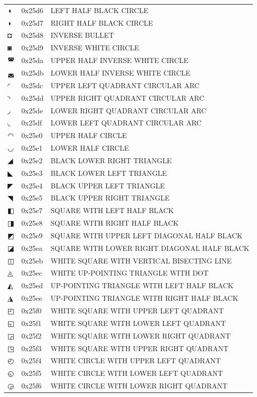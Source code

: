 \documentclass[12pt, twoside]{article}
\begin{document}
\begin{longtable}{L{1.0cm} L{2.0cm} >{\footnotesize}L{10cm}}
$◖$&0x25d6&LEFT HALF BLACK CIRCLE\\
$◗$&0x25d7&RIGHT HALF BLACK CIRCLE\\
$◘$&0x25d8&INVERSE BULLET\\
$◙$&0x25d9&INVERSE WHITE CIRCLE\\
$◚$&0x25da&UPPER HALF INVERSE WHITE CIRCLE\\
$◛$&0x25db&LOWER HALF INVERSE WHITE CIRCLE\\
$◜$&0x25dc&UPPER LEFT QUADRANT CIRCULAR ARC\\
$◝$&0x25dd&UPPER RIGHT QUADRANT CIRCULAR ARC\\
$◞$&0x25de&LOWER RIGHT QUADRANT CIRCULAR ARC\\
$◟$&0x25df&LOWER LEFT QUADRANT CIRCULAR ARC\\
$◠$&0x25e0&UPPER HALF CIRCLE\\
$◡$&0x25e1&LOWER HALF CIRCLE\\
$◢$&0x25e2&BLACK LOWER RIGHT TRIANGLE\\
$◣$&0x25e3&BLACK LOWER LEFT TRIANGLE\\
$◤$&0x25e4&BLACK UPPER LEFT TRIANGLE\\
$◥$&0x25e5&BLACK UPPER RIGHT TRIANGLE\\
$◧$&0x25e7&SQUARE WITH LEFT HALF BLACK\\
$◨$&0x25e8&SQUARE WITH RIGHT HALF BLACK\\
$◩$&0x25e9&SQUARE WITH UPPER LEFT DIAGONAL HALF BLACK\\
$◪$&0x25ea&SQUARE WITH LOWER RIGHT DIAGONAL HALF BLACK\\
$◫$&0x25eb&WHITE SQUARE WITH VERTICAL BISECTING LINE\\
$◬$&0x25ec&WHITE UP-POINTING TRIANGLE WITH DOT\\
$◭$&0x25ed&UP-POINTING TRIANGLE WITH LEFT HALF BLACK\\
$◮$&0x25ee&UP-POINTING TRIANGLE WITH RIGHT HALF BLACK\\
$◰$&0x25f0&WHITE SQUARE WITH UPPER LEFT QUADRANT\\
$◱$&0x25f1&WHITE SQUARE WITH LOWER LEFT QUADRANT\\
$◲$&0x25f2&WHITE SQUARE WITH LOWER RIGHT QUADRANT\\
$◳$&0x25f3&WHITE SQUARE WITH UPPER RIGHT QUADRANT\\
$◴$&0x25f4&WHITE CIRCLE WITH UPPER LEFT QUADRANT\\
$◵$&0x25f5&WHITE CIRCLE WITH LOWER LEFT QUADRANT\\
$◶$&0x25f6&WHITE CIRCLE WITH LOWER RIGHT QUADRANT\\

\end{longtable}
\end{document}
